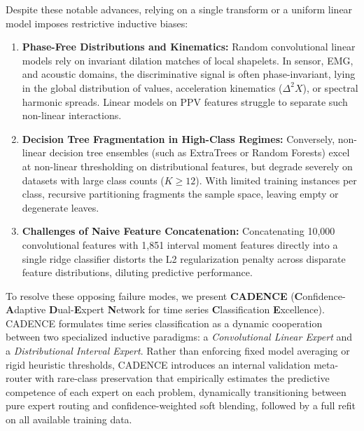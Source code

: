 \documentclass[journal,twocolumn]{article}
\begin{document}
Despite these notable advances, relying on a single transform or a uniform linear model imposes restrictive inductive biases:
\begin{enumerate}
    \item \textbf{Phase-Free Distributions and Kinematics:} Random convolutional linear models rely on invariant dilation matches of local shapelets. In sensor, EMG, and acoustic domains, the discriminative signal is often phase-invariant, lying in the global distribution of values, acceleration kinematics ($\Delta^2 X$), or spectral harmonic spreads. Linear models on PPV features struggle to separate such non-linear interactions.
    \item \textbf{Decision Tree Fragmentation in High-Class Regimes:} Conversely, non-linear decision tree ensembles (such as ExtraTrees or Random Forests) excel at non-linear thresholding on distributional features, but degrade severely on datasets with large class counts ($K \ge 12$). With limited training instances per class, recursive partitioning fragments the sample space, leaving empty or degenerate leaves.
    \item \textbf{Challenges of Naive Feature Concatenation:} Concatenating 10,000 convolutional features with 1,851 interval moment features directly into a single ridge classifier distorts the L2 regularization penalty across disparate feature distributions, diluting predictive performance.
\end{enumerate}

To resolve these opposing failure modes, we present \textbf{CADENCE} (\textbf{C}onfidence-\textbf{A}daptive \textbf{D}ual-\textbf{E}xpert \textbf{N}etwork for time series \textbf{C}lassification \textbf{E}xcellence). CADENCE formulates time series classification as a dynamic cooperation between two specialized inductive paradigms: a \textit{Convolutional Linear Expert} and a \textit{Distributional Interval Expert}. Rather than enforcing fixed model averaging or rigid heuristic thresholds, CADENCE introduces an internal validation meta-router with rare-class preservation that empirically estimates the predictive competence of each expert on each problem, dynamically transitioning between pure expert routing and confidence-weighted soft blending, followed by a full refit on all available training data.
\end{document}
